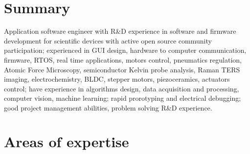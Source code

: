 \documentclass{sb_cv}
\begin{document}
\makecvtitle
\vspace*{-15mm}

\section{Summary}
Application software engineer with R\&D experience in software and firmware development for scientific devices with active open source community participation; experienced in GUI design, hardware to computer communication, firmware, RTOS, real time applications, motors control, pneumatics regulation, Atomic Force Microscopy, semiconductor Kelvin probe analysis, Raman TERS imaging, electrochemistry, BLDC, stepper motors, piezoceramics, actuators control; have experience in algorithms design, data acquisition and processing, computer vision, machine learning; rapid prorotyping and electrical debugging; good project management abilities, problem solving R\&D experience.

\vspace*{-4mm}
\section{Areas of expertise}

\vspace*{-4mm}
\end{document}
